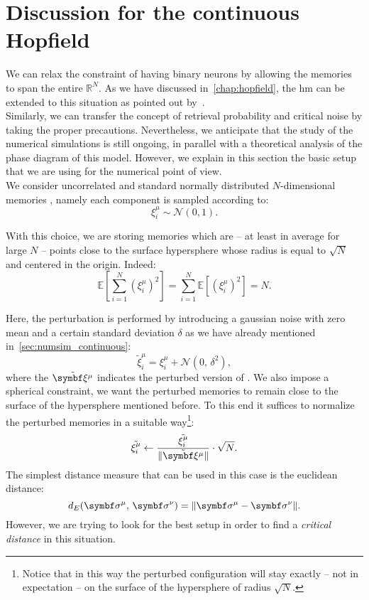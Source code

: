 \documentclass[\rootdir/main.tex]{subfiles}
\begin{document}
\section{Discussion for the continuous Hopfield}
We can relax the constraint of having binary neurons by allowing the memories to span the entire $\mathbb{R}^N$. As we have discussed in~\cref{chap:hopfield}, the \acrlong{hm} can be extended to this situation as pointed out by~\textcite{hopfield_is_all_you_need}.\\
Similarly, we can transfer the concept of retrieval probability and critical noise by taking the proper precautions.
Nevertheless, we anticipate that the study of the numerical simulations is still ongoing, in parallel with a theoretical analysis of the phase diagram of this model. However, we explain in this section the basic setup that we are using for the numerical point of view.\\
We consider uncorrelated and standard normally distributed $N$-dimensional memories \bxi, namely each component is sampled according to:
\begin{equation}
    \xi_i^{\mu} \sim \mathcal{N} \left(0, 1\right).
\end{equation}
\begin{remark}
    With this choice, we are storing memories which are -- at least in average for large $N$ -- points close to the surface hypersphere whose radius is equal to $\sqrt{N}$ and centered in the origin. Indeed:
    \begin{equation}
        \mathbb{E} \left[ \sum_{i=1}^{N} \left(\xi_i^{\mu}\right)^2 \right] = \sum_{i = 1}^{N} \mathbb{E} \left[ \left(\xi_i^{\mu}\right)^2 \right] = N.
    \end{equation}
\end{remark}
Here, the perturbation is performed by introducing a gaussian noise with zero mean and a certain standard deviation $\delta$ as we have already mentioned in~\cref{sec:numsim_continuous}:
\begin{equation*}
    \tilde{\xi}_i^{\mu} = \xi_i^{\mu} + \mathcal{N}\left(0, \, \delta^2\right),
\end{equation*}
where the $\tilde{\bxi}$ indicates the perturbed version of \bxi.
We also impose a spherical constraint, \ie we want the perturbed memories to remain close to the surface of the hypersphere mentioned before. To this end it suffices to normalize the perturbed memories in a suitable way\footnote{Notice that in this way the perturbed configuration will stay exactly -- not in expectation -- on the surface of the hypersphere of radius $\sqrt{N}$.}:
\begin{equation*}
    \tilde{\xi_i^{\mu}} \gets \frac{\tilde{\xi_i^{\mu}}}{\lVert \tilde{\bxi}
    \rVert} \cdot \sqrt{N}.
\end{equation*}
The simplest distance measure that can be used in this case is the euclidean distance:
\begin{equation}
    d_E(\bsigma^\mu, \, \bsigma^\nu) = \lVert \bsigma^\mu - \bsigma^\nu \rVert.
\end{equation}
However, we are trying to look for the best setup in order to find a \emph{critical distance} in this situation.
\subbibliography
\end{document}

